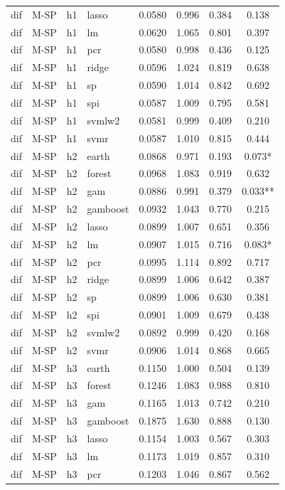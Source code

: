 \begin{ThreePartTable}
\begin{longtable}[t]{llclcccc}
dif & M-SP & h1 & lasso & 0.0580 & 0.996 & 0.384 & 0.138\\
dif & M-SP & h1 & lm & 0.0620 & 1.065 & 0.801 & 0.397\\
dif & M-SP & h1 & pcr & 0.0580 & 0.998 & 0.436 & 0.125\\
dif & M-SP & h1 & ridge & 0.0596 & 1.024 & 0.819 & 0.638\\
dif & M-SP & h1 & sp & 0.0590 & 1.014 & 0.842 & 0.692\\
dif & M-SP & h1 & spi & 0.0587 & 1.009 & 0.795 & 0.581\\
dif & M-SP & h1 & svmlw2 & 0.0581 & 0.999 & 0.409 & 0.210\\
dif & M-SP & h1 & svmr & 0.0587 & 1.010 & 0.815 & 0.444\\
\addlinespace
dif & M-SP & h2 & earth & 0.0868 & 0.971 & 0.193 & 0.073*\\
dif & M-SP & h2 & forest & 0.0968 & 1.083 & 0.919 & 0.632\\
dif & M-SP & h2 & gam & 0.0886 & 0.991 & 0.379 & 0.033**\\
dif & M-SP & h2 & gamboost & 0.0932 & 1.043 & 0.770 & 0.215\\
dif & M-SP & h2 & lasso & 0.0899 & 1.007 & 0.651 & 0.356\\
dif & M-SP & h2 & lm & 0.0907 & 1.015 & 0.716 & 0.083*\\
dif & M-SP & h2 & pcr & 0.0995 & 1.114 & 0.892 & 0.717\\
dif & M-SP & h2 & ridge & 0.0899 & 1.006 & 0.642 & 0.387\\
dif & M-SP & h2 & sp & 0.0899 & 1.006 & 0.630 & 0.381\\
dif & M-SP & h2 & spi & 0.0901 & 1.009 & 0.679 & 0.438\\
dif & M-SP & h2 & svmlw2 & 0.0892 & 0.999 & 0.420 & 0.168\\
dif & M-SP & h2 & svmr & 0.0906 & 1.014 & 0.868 & 0.665\\
\addlinespace
dif & M-SP & h3 & earth & 0.1150 & 1.000 & 0.504 & 0.139\\
dif & M-SP & h3 & forest & 0.1246 & 1.083 & 0.988 & 0.810\\
dif & M-SP & h3 & gam & 0.1165 & 1.013 & 0.742 & 0.210\\
dif & M-SP & h3 & gamboost & 0.1875 & 1.630 & 0.888 & 0.130\\
dif & M-SP & h3 & lasso & 0.1154 & 1.003 & 0.567 & 0.303\\
dif & M-SP & h3 & lm & 0.1173 & 1.019 & 0.857 & 0.310\\
dif & M-SP & h3 & pcr & 0.1203 & 1.046 & 0.867 & 0.562\\

\end{longtable}
\end{ThreePartTable}
